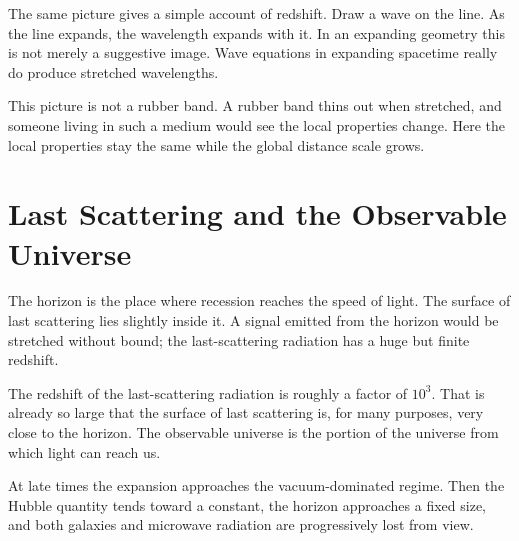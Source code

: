 The same picture gives a simple account of redshift. Draw a wave on the line. As the line expands, the wavelength expands with it. In an expanding geometry this is not merely a suggestive image. Wave equations in expanding spacetime really do produce stretched wavelengths.

\begin{classroomqa}
\end{classroomqa}

This picture is not a rubber band. A rubber band thins out when stretched, and someone living in such a medium would see the local properties change. Here the local properties stay the same while the global distance scale grows.

\section{Last Scattering and the Observable Universe}

The horizon is the place where recession reaches the speed of light. The surface of last scattering lies slightly inside it. A signal emitted from the horizon would be stretched without bound; the last-scattering radiation has a huge but finite redshift.

\begin{classroomqa}
\end{classroomqa}

The redshift of the last-scattering radiation is roughly a factor of \(10^3\). That is already so large that the surface of last scattering is, for many purposes, very close to the horizon. The observable universe is the portion of the universe from which light can reach us.

At late times the expansion approaches the vacuum-dominated regime. Then the Hubble quantity tends toward a constant, the horizon approaches a fixed size, and both galaxies and microwave radiation are progressively lost from view.

